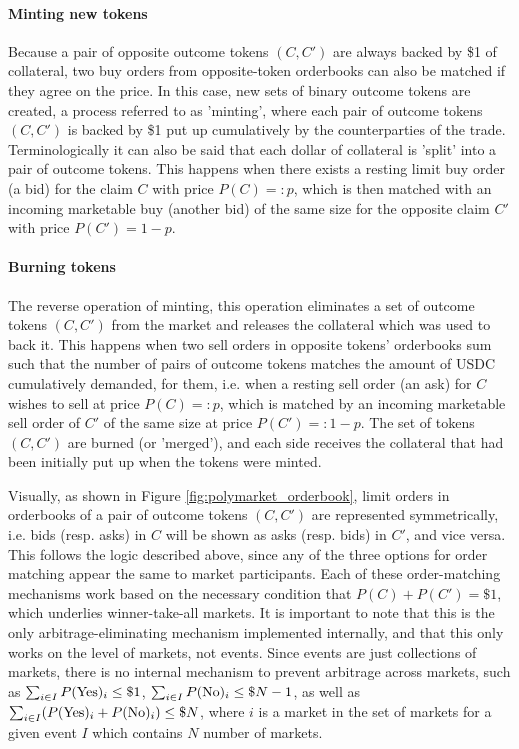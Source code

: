 \paragraph{Minting new tokens} Because a pair of opposite outcome tokens $(C, C')$ are always backed by \$1 of collateral,
two buy orders from opposite-token orderbooks can also be matched if they agree on the price.
In this case, new sets of binary outcome tokens are created, a process referred to as 'minting', where each pair of outcome tokens $(C, C')$ is backed by \$1 put up cumulatively by the counterparties of the trade.
Terminologically it can also be said that each dollar of collateral is 'split' into a pair of outcome tokens.
This happens when there exists a resting limit buy order (a bid) for the claim $C$ with price $P(C) =: p$, which is then matched with an incoming marketable buy (another bid) of the same size for the opposite claim $C'$ with price $P(C') = 1 - p$.

\paragraph{Burning tokens} The reverse operation of minting, this operation eliminates a set of outcome tokens $(C, C')$ from the market and releases the collateral which was used to back it.
This happens when two sell orders in opposite tokens' orderbooks sum such that the number of pairs of outcome tokens matches the amount of USDC cumulatively demanded, for them, i.e. when a resting sell order (an ask) for $C$ wishes to sell at price $P(C) =: p$, which is matched by an incoming marketable sell order of $C'$ of the same size at price $P(C') =: 1 - p$.
The set of tokens $(C, C')$ are burned (or 'merged'), and each side receives the collateral that had been initially put up when the tokens were minted.

Visually, as shown in Figure \ref{fig:polymarket_orderbook}, limit orders in orderbooks of a pair of outcome tokens $(C, C')$ are represented symmetrically, i.e. bids (resp. asks) in $C$ will be shown as asks (resp. bids) in $C'$, and vice versa. This follows the logic described above, since any of the three options for order matching appear the same to market participants.
Each of these order-matching mechanisms work based on the necessary condition that $P(C) + P(C') = \$1$, which underlies winner-take-all markets.
It is important to note that this is the only arbitrage-eliminating mechanism implemented internally, and that this only works on the level of markets, not events.
Since events are just collections of markets, there is no internal mechanism to prevent arbitrage across markets, such as
$\sum_{i \in I} P(\text{Yes})_{i} \le \$1$, $\sum_{i \in I} P(\text{No})_{i} \le \$N - 1$, as well as $\sum_{i \in I} (P(\text{Yes})_{i} + P(\text{No})_{i}) \le \$N$,
where $i$ is a market in the set of markets for a given event $I$ which contains $N$ number of markets.
\parencite{PMDocs, saguillo_unravelling_2025}

